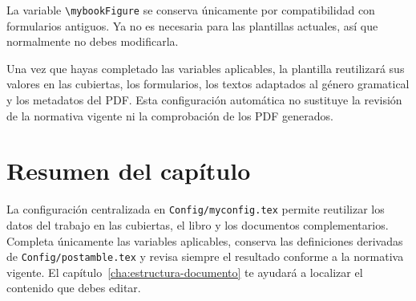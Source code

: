 La variable \texttt{\textbackslash{}mybookFigure} se conserva únicamente por compatibilidad con formularios antiguos. Ya no es necesaria para las plantillas actuales, así que normalmente no debes modificarla.

Una vez que hayas completado las variables aplicables, la plantilla reutilizará sus valores en las cubiertas, los formularios, los textos adaptados al género gramatical y los metadatos del PDF. Esta configuración automática no sustituye la revisión de la normativa vigente ni la comprobación de los PDF generados.

\section{Resumen del capítulo}
\label{sec:resumen-configuracion}

La configuración centralizada en \texttt{Config/myconfig.tex} permite reutilizar los datos del trabajo en las cubiertas, el libro y los documentos complementarios. Completa únicamente las variables aplicables, conserva las definiciones derivadas de \texttt{Config/postamble.tex} y revisa siempre el resultado conforme a la normativa vigente. El capítulo~\ref{cha:estructura-documento} te ayudará a localizar el contenido que debes editar.

